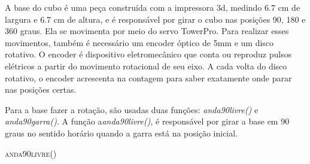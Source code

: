     A base do cubo é uma peça construída com a impressora 3d, medindo 6.7 cm de largura e 6.7 cm de altura, e é responsável por girar o cubo nas posições 90, 180 e 360 graus. Ela se movimenta por meio do servo TowerPro. Para realizar esses movimentos, também é necessário um encoder óptico de 5mm e um disco rotativo. O encoder é dispositivo eletromecânico que conta ou reproduz pulsos elétricos a partir do movimento rotacional de seu eixo. A cada volta do disco rotativo, o encoder acrescenta na contagem para saber exatamente onde parar nas posições certas.

    Para a base fazer a rotação, são usadas duas funções: \textit{anda90livre()} e \textit{anda90garra()}. A função a\textit{anda90livre()}, é responsável por girar a base em 90 graus no sentido horário quando a garra está na posição inicial.
    
    
    
\begin{algorithm}[H]
   \SetAlgoLined
   
   \label{alg1}
   \caption{\textsc{anda90livre()}}
 \end{algorithm}
    
